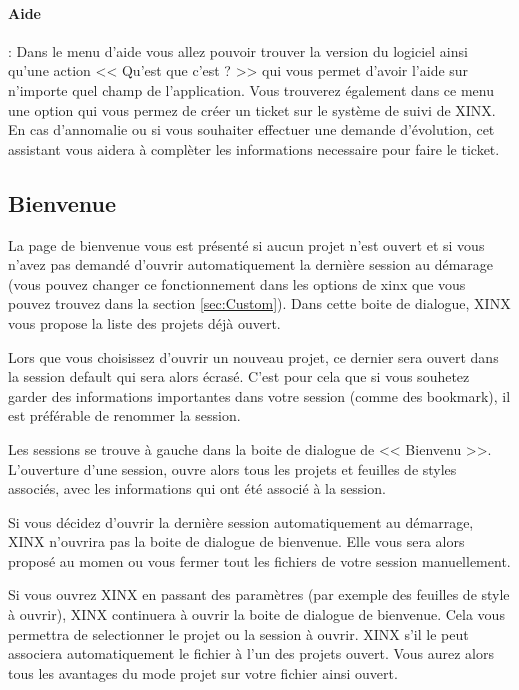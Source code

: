 \documentclass[a4paper,10pt,twoside]{book}
\begin{document}
\paragraph{Aide} : Dans le menu d'aide vous allez pouvoir trouver la version du logiciel ainsi qu'une action << Qu'est que c'est ? >> qui vous permet d'avoir l'aide sur n'importe quel champ de l'application. Vous trouverez également dans ce menu une option qui vous permez de créer un ticket sur le système de suivi de XINX. En cas d'annomalie ou si vous souhaiter effectuer une demande d'évolution, cet assistant vous aidera à complèter les informations necessaire pour faire le ticket.


\subsection{Bienvenue}
\label{sub:bienvenue}

La page de bienvenue vous est présenté si aucun projet n'est ouvert et si vous n'avez pas demandé d'ouvrir automatiquement la dernière session au démarage (vous pouvez changer ce fonctionnement dans les options de xinx que vous pouvez trouvez dans la section \ref{sec:Custom}). Dans cette boite de dialogue, XINX vous propose la liste des projets déjà ouvert. 

Lors que vous choisissez d'ouvrir un nouveau projet, ce dernier sera ouvert dans la session default qui sera alors écrasé. C'est pour cela que si vous souhetez garder des informations importantes dans votre session (comme des bookmark), il est préférable de renommer la session.

Les sessions se trouve à gauche dans la boite de dialogue de << Bienvenu >>. L'ouverture d'une session, ouvre alors tous les projets et feuilles de styles associés, avec les informations qui ont été associé à la session. 

Si vous décidez d'ouvrir la dernière session automatiquement au démarrage, XINX n'ouvrira pas la boite de dialogue de bienvenue. Elle vous sera alors proposé au momen ou vous fermer tout les fichiers de votre session manuellement.

Si vous ouvrez XINX en passant des paramètres (par exemple des feuilles de style à ouvrir), XINX continuera à ouvrir la boite de dialogue de bienvenue. Cela vous permettra de selectionner le projet ou la session à ouvrir. XINX s'il le peut associera automatiquement le fichier à l'un des projets ouvert. Vous aurez alors tous les avantages du mode projet sur votre fichier ainsi ouvert.
\end{document}
